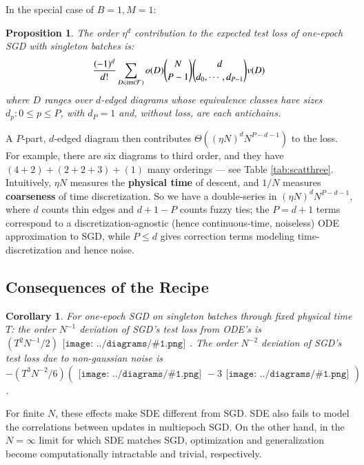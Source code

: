 \documentclass{article}
\newtheorem{cor}{Corollary}
\newtheorem{prop}{Proposition}
\newcommand{\Free}{\mathcal{F}}
\newcommand{\image}{\text{\textnormal{im}}}
\newcommand{\sdia}[1]{\begin{gathered}\texttt{[image: ../diagrams/\#1.png]}\end{gathered}}
\begin{document}
        In the special case of $B=1, M=1$:
        \begin{prop}
            The order $\eta^d$ contribution to the expected test loss of one-epoch
            SGD with singleton batches is:
            \begin{equation}\label{eq:sgdbasiccoef}
                \frac{(-1)^d}{d!} \sum_{D\in \image(\Free)} 
                o(D) {N \choose P-1} {d \choose d_0,\cdots,d_{P-1}}
                v(D)
            \end{equation}
            where $D$ ranges over $d$-edged diagrams whose equivalence classes
            have sizes $d_p: 0\leq p\leq P$, with $d_P=1$
            and, without loss, are each antichains.
        \end{prop}
        A $P$-part, $d$-edged diagram then contributes $\Theta\left((\eta N)^d
        N^{P-d-1}\right)$ to the loss.  For example, there are six diagrams to
        third order, and they have $(4+2)+(2+2+3)+(1)$ many orderings --- see
        Table \ref{tab:scatthree}.  Intuitively, $\eta N$ measures the {\bf
        physical time} of descent, and $1/N$ measures {\bf coarseness} of time
        discretization.  So we have a double-series in $(\eta N)^d N^{P-d-1}$,
        where $d$ counts thin edges and $d+1-P$ counts fuzzy ties; the $P=d+1$
        terms correspond to a discretization-agnostic (hence continuous-time,
        noiseless) ODE approximation to SGD, while $P\leq d$ gives correction
        terms modeling time-discretization and hence noise.  


    \subsection{Consequences of the Recipe}

        \begin{cor}
            For one-epoch SGD on singleton batches through fixed physical time
            $T$: the order $N^{-1}$ deviation of SGD's test loss from ODE's is
            $
                ({{T^2 N^{-1}}/{2}}) \sdia{c(01-2)(02-12)}
            $.
            The order $N^{-2}$ deviation of SGD's test loss due to non-gaussian
            noise is
            $
                -({{T^3 N^{-2}}/{6}}) (\sdia{c(012-3)(03-13-23)} - 3 \sdia{c(01-2-3)(03-13-23)})
            $.
        \end{cor}
        For finite $N$, these effects make SDE different from SGD.  SDE also
        fails to model the correlations between updates in multiepoch SGD.  On
        the other hand, in the $N=\infty$ limit for which SDE matches SGD,
        optimization and generalization become computationally intractable and
        trivial, respectively. 
    
\end{document}
